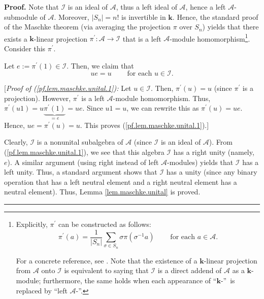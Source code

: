 \documentclass[numbers=enddot,12pt,final,onecolumn,notitlepage]{scrartcl}%
\numberwithin{exer}{subsection}
\theoremstyle{definition}
\newenvironment{proof}[1][Proof]{\noindent\textbf{#1.} }{\ \rule{0.5em}{0.5em}}
\let\sumnonlimits\sum
\renewcommand{\sum}{\sumnonlimits\limits}
\begin{document}
\begin{proof}
Note that $\mathcal{I}$ is an ideal of $\mathcal{A}$, thus a left ideal of
$\mathcal{A}$, hence a left $\mathcal{A}$-submodule of $\mathcal{A}$.
Moreover, $\left\vert S_{n}\right\vert =n!$ is invertible in $\mathbf{k}$.
Hence, the standard proof of the Maschke theorem (via averaging the projection
$\pi$ over $S_{n}$) yields that there exists a $\mathbf{k}$-linear projection
$\pi^{\prime}:\mathcal{A}\rightarrow\mathcal{I}$ that is a left $\mathcal{A}%
$-module homomorphism\footnote{Explicitly, $\pi^{\prime}$ can be constructed
as follows:%
\[
\pi^{\prime}\left(  a\right)  =\dfrac{1}{\left\vert S_{n}\right\vert }%
\sum_{\sigma\in S_{n}}\sigma\pi\left(  \sigma^{-1}a\right)
\ \ \ \ \ \ \ \ \ \ \text{for each }a\in\mathcal{A}.
\]
\par
For a concrete reference, see \cite[Theorem 4.4.14]{sga}. Note that the
existence of a $\mathbf{k}$-linear projection from $\mathcal{A}$ onto
$\mathcal{I}$ is equivalent to saying that $\mathcal{I}$ is a direct addend of
$\mathcal{A}$ as a $\mathbf{k}$-module; furthermore, the same holds when each
appearance of \textquotedblleft$\mathbf{k}$-\textquotedblright\ is replaced by
\textquotedblleft left $\mathcal{A}$-\textquotedblright.}. Consider this
$\pi^{\prime}$.

Let $e:=\pi^{\prime}\left(  1\right)  \in\mathcal{I}$. Then, we claim that
\begin{equation}
ue=u\ \ \ \ \ \ \ \ \ \ \text{for each }u\in\mathcal{I}.
\label{pf.lem.maschke.unital.1}%
\end{equation}


[\textit{Proof of (\ref{pf.lem.maschke.unital.1}):} Let $u\in\mathcal{I}$.
Then, $\pi^{\prime}\left(  u\right)  =u$ (since $\pi^{\prime}$ is a
projection). However, $\pi^{\prime}$ is a left $\mathcal{A}$-module
homomorphism. Thus, $\pi^{\prime}\left(  u1\right)  =u\underbrace{\pi^{\prime
}\left(  1\right)  }_{=e}=ue$. Since $u1=u$, we can rewrite this as
$\pi^{\prime}\left(  u\right)  =ue$. Hence, $ue=\pi^{\prime}\left(  u\right)
=u$. This proves (\ref{pf.lem.maschke.unital.1}).] \medskip

Clearly, $\mathcal{I}$ is a nonunital subalgebra of $\mathcal{A}$ (since
$\mathcal{I}$ is an ideal of $\mathcal{A}$). From
(\ref{pf.lem.maschke.unital.1}), we see that this algebra $\mathcal{I}$ has a
right unity (namely, $e$). A similar argument (using right instead of left
$\mathcal{A}$-modules) yields that $\mathcal{I}$ has a left unity. Thus, a
standard argument shows that $\mathcal{I}$ has a unity (since any binary
operation that has a left neutral element and a right neutral element has a
neutral element). Thus, Lemma \ref{lem.maschke.unital} is proved.
\end{proof}
\end{document}
